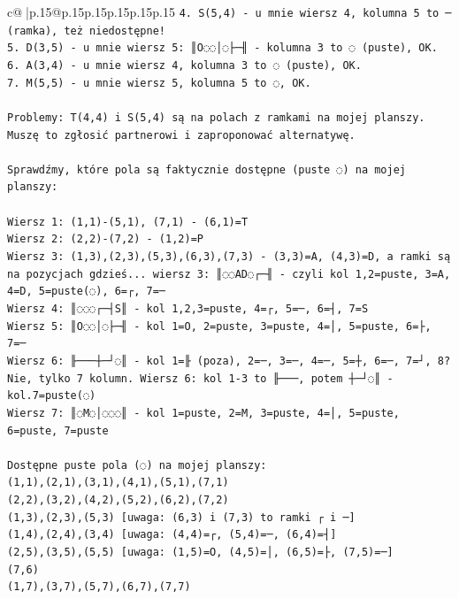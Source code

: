 \documentclass{article}
\begin{document}
{\begin{supertabular}{c@{$\;$}|p{.15\linewidth}@{}p{.15\linewidth}p{.15\linewidth}p{.15\linewidth}p{.15\linewidth}p{.15\linewidth}}
{{{\texttt{4. S(5,4) {-} u mnie wiersz 4, kolumna 5 to ─ (ramka), też niedostępne!} \\
\texttt{5. D(3,5) {-} u mnie wiersz 5: ║O◌◌│◌├─╢ {-} kolumna 3 to ◌ (puste), OK.} \\
\texttt{6. A(3,4) {-} u mnie wiersz 4, kolumna 3 to ◌ (puste), OK.} \\
\texttt{7. M(5,5) {-} u mnie wiersz 5, kolumna 5 to ◌, OK.} \\
\\ 
\texttt{Problemy: T(4,4) i S(5,4) są na polach z ramkami na mojej planszy. Muszę to zgłosić partnerowi i zaproponować alternatywę.} \\
\\ 
\texttt{Sprawdźmy, które pola są faktycznie dostępne (puste ◌) na mojej planszy:} \\
\\ 
\texttt{Wiersz 1: (1,1){-}(5,1), (7,1) {-} (6,1)=T} \\
\texttt{Wiersz 2: (2,2){-}(7,2) {-} (1,2)=P} \\
\texttt{Wiersz 3: (1,3),(2,3),(5,3),(6,3),(7,3) {-} (3,3)=A, (4,3)=D, a ramki są na pozycjach gdzieś... wiersz 3: ║◌◌AD◌┌─╢ {-} czyli kol 1,2=puste, 3=A, 4=D, 5=puste(◌), 6=┌, 7=─} \\
\texttt{Wiersz 4: ║◌◌◌┌─┤S║ {-} kol 1,2,3=puste, 4=┌, 5=─, 6=┤, 7=S} \\
\texttt{Wiersz 5: ║O◌◌│◌├─╢ {-} kol 1=O, 2=puste, 3=puste, 4=│, 5=puste, 6=├, 7=─} \\
\texttt{Wiersz 6: ╟───┼─┘◌║ {-} kol 1=╟ (poza), 2=─, 3=─, 4=─, 5=┼, 6=─, 7=┘, 8? Nie, tylko 7 kolumn. Wiersz 6: kol 1{-}3 to ╟───, potem ┼─┘◌║ {-} kol.7=puste(◌)} \\
\texttt{Wiersz 7: ║◌M◌│◌◌◌║ {-} kol 1=puste, 2=M, 3=puste, 4=│, 5=puste, 6=puste, 7=puste} \\
\\ 
\texttt{Dostępne puste pola (◌) na mojej planszy:} \\
\texttt{(1,1),(2,1),(3,1),(4,1),(5,1),(7,1)} \\
\texttt{(2,2),(3,2),(4,2),(5,2),(6,2),(7,2)} \\
\texttt{(1,3),(2,3),(5,3)  {[}uwaga: (6,3) i (7,3) to ramki ┌ i ─{]}} \\
\texttt{(1,4),(2,4),(3,4)  {[}uwaga: (4,4)=┌, (5,4)=─, (6,4)=┤{]}} \\
\texttt{(2,5),(3,5),(5,5)  {[}uwaga: (1,5)=O, (4,5)=│, (6,5)=├, (7,5)=─{]}} \\
\texttt{(7,6)} \\
\texttt{(1,7),(3,7),(5,7),(6,7),(7,7)} \\
}}}
\end{supertabular}}
\end{document}
